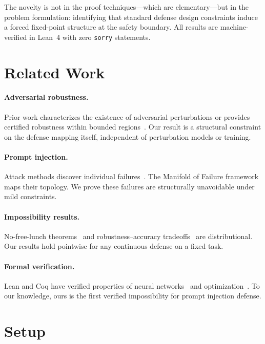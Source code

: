 \documentclass[11pt]{article}
\begin{document}
The novelty is not in the proof techniques---which are elementary---but in the problem formulation: identifying that standard defense design constraints induce a forced fixed-point structure at the safety boundary. All results are machine-verified in Lean~4 with zero \texttt{sorry} statements.

\section{Related Work}
\label{sec:related}

\paragraph{Adversarial robustness.} Prior work characterizes the existence of adversarial perturbations or provides certified robustness within bounded regions~\cite{szegedy2013intriguing,goodfellow2014explaining,cohen2019certified,singh2019abstract,katz2017reluplex}. Our result is a structural constraint on the defense mapping itself, independent of perturbation models or training.

\paragraph{Prompt injection.} Attack methods discover individual failures~\cite{zou2023universal,chao2024jailbreaking,mehrotra2024tree,samvelyan2024rainbow}. The Manifold of Failure framework~\cite{bhatt2025manifold} maps their topology. We prove these failures are structurally unavoidable under mild constraints.

\paragraph{Impossibility results.} No-free-lunch theorems~\cite{wolpert1997no} and robustness--accuracy tradeoffs~\cite{tsipras2018robustness} are distributional. Our results hold pointwise for any continuous defense on a fixed task.

\paragraph{Formal verification.} Lean and Coq have verified properties of neural networks~\cite{bagnall2019certifying} and optimization~\cite{bolte2024}. To our knowledge, ours is the first verified impossibility for prompt injection defense.

\section{Setup}
\label{sec:setup}
\end{document}
